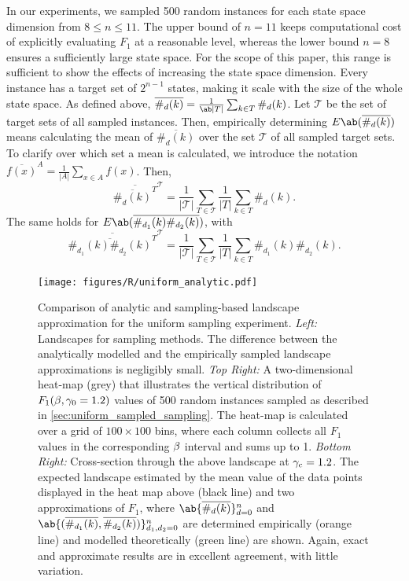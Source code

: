 In our experiments, we sampled 500 random instances for each state space dimension from $8 \leq n \leq 11$. The upper bound of $n = 11$ keeps computational cost of explicitly evaluating $F_1$ at a reasonable level, whereas the lower bound $n = 8$ ensures a sufficiently large state space. For the scope of this paper, this range is sufficient to show the effects of increasing the state space dimension. Every instance has a target set of $2^{n-1}$ states, making it scale with the size of the whole state space. As defined above, $\overline{\#_d (k)} = \frac{1}{\ab|T|}\sum_{k \in T} \#_d (k)$. Let $\mathcal{T}$ be the set of target sets of all sampled instances. Then, empirically determining $E\ab(\overline{\#_d (k)})$ means calculating the mean of $\overline{\#_d (k)}$ over the set $\mathcal{T}$ of all sampled target sets. To clarify over which set a mean is calculated, we introduce the notation $\overline{f(x)}^A = \frac{1}{|A|} \sum_{x \in A} f(x)$. Then,
\begin{displaymath}
\overline{\overline{\#_d (k)}^T}^\mathcal{T} = \frac{1}{|\mathcal{T}|}\sum_{T \in \mathcal{T}} \frac{1}{|T|} \sum_{k \in T} \#_d (k).
\end{displaymath}
The same holds for $E\ab(\overline{\#_{d_1}(k) \#_{d_2} (k)})$, with 
\begin{displaymath}
    \overline{\overline{\#_{d_1} (k) \#_{d_2}(k)}^T}^\mathcal{T} = \frac{1}{|\mathcal{T}|}\sum_{T \in \mathcal{T}} \frac{1}{|T|} \sum_{k \in T} \#_{d_1} (k) \#_{d_2} (k).
\end{displaymath}

\begin{figure}
    \centering
    \texttt{[image: figures/R/uniform\_analytic.pdf]}\vspace*{-1.5em}
    \caption{Comparison of analytic and sampling-based landscape approximation for the uniform sampling experiment.
    \emph{Left:} Landscapes for sampling methods. The difference between the analytically modelled and the empirically sampled landscape approximations is negligibly small.
    \emph{Top Right:} A two-dimensional heat-map  (grey) that illustrates the vertical distribution of $F_1(\beta, \gamma_0 = 1.2)$ values of 500 random instances sampled as described in \cref{sec:uniform_sampled_sampling}. The heat-map is calculated over a grid of $100 \times 100$ bins, where each column collects all $F_1$ values in the corresponding $\beta$ interval and sums up to 1.
    \emph{Bottom Right:} Cross-section through the above landscape at $\gamma_{\text{c}} = 1.2$. The expected landscape estimated by the mean value of the data points displayed in the heat map above  (black line) and two approximations of $F_1$, where $\ab\{\overline{\#_d (k)}\}_{d = 0}^n$ and $\ab\{(\overline{\#_{d_1} (k)}, \overline{\#_{d_2} (k)})\}_{d_1, d_2 = 0}^n$ are determined empirically  (orange line) and modelled theoretically  (green line) are shown. Again, exact and approximate results are in excellent agreement, with little variation.}
    \label{fig:uniform_analytic}
\end{figure}

